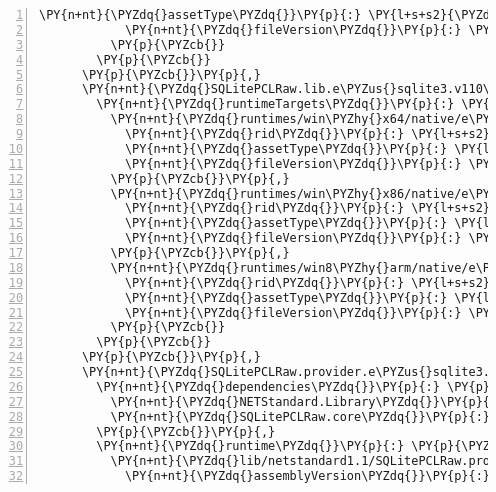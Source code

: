 \begin{Verbatim}[commandchars=\\\{\},numbers=left,firstnumber=1,stepnumber=1,numberblanklines=0]
            \PY{n+nt}{\PYZdq{}assetType\PYZdq{}}\PY{p}{:} \PY{l+s+s2}{\PYZdq{}native\PYZdq{}}\PY{p}{,}
            \PY{n+nt}{\PYZdq{}fileVersion\PYZdq{}}\PY{p}{:} \PY{l+s+s2}{\PYZdq{}0.0.0.0\PYZdq{}}
          \PY{p}{\PYZcb{}}
        \PY{p}{\PYZcb{}}
      \PY{p}{\PYZcb{}}\PY{p}{,}
      \PY{n+nt}{\PYZdq{}SQLitePCLRaw.lib.e\PYZus{}sqlite3.v110\PYZus{}xp/1.1.10\PYZdq{}}\PY{p}{:} \PY{p}{\PYZob{}}
        \PY{n+nt}{\PYZdq{}runtimeTargets\PYZdq{}}\PY{p}{:} \PY{p}{\PYZob{}}
          \PY{n+nt}{\PYZdq{}runtimes/win\PYZhy{}x64/native/e\PYZus{}sqlite3.dll\PYZdq{}}\PY{p}{:} \PY{p}{\PYZob{}}
            \PY{n+nt}{\PYZdq{}rid\PYZdq{}}\PY{p}{:} \PY{l+s+s2}{\PYZdq{}win\PYZhy{}x64\PYZdq{}}\PY{p}{,}
            \PY{n+nt}{\PYZdq{}assetType\PYZdq{}}\PY{p}{:} \PY{l+s+s2}{\PYZdq{}native\PYZdq{}}\PY{p}{,}
            \PY{n+nt}{\PYZdq{}fileVersion\PYZdq{}}\PY{p}{:} \PY{l+s+s2}{\PYZdq{}0.0.0.0\PYZdq{}}
          \PY{p}{\PYZcb{}}\PY{p}{,}
          \PY{n+nt}{\PYZdq{}runtimes/win\PYZhy{}x86/native/e\PYZus{}sqlite3.dll\PYZdq{}}\PY{p}{:} \PY{p}{\PYZob{}}
            \PY{n+nt}{\PYZdq{}rid\PYZdq{}}\PY{p}{:} \PY{l+s+s2}{\PYZdq{}win\PYZhy{}x86\PYZdq{}}\PY{p}{,}
            \PY{n+nt}{\PYZdq{}assetType\PYZdq{}}\PY{p}{:} \PY{l+s+s2}{\PYZdq{}native\PYZdq{}}\PY{p}{,}
            \PY{n+nt}{\PYZdq{}fileVersion\PYZdq{}}\PY{p}{:} \PY{l+s+s2}{\PYZdq{}0.0.0.0\PYZdq{}}
          \PY{p}{\PYZcb{}}\PY{p}{,}
          \PY{n+nt}{\PYZdq{}runtimes/win8\PYZhy{}arm/native/e\PYZus{}sqlite3.dll\PYZdq{}}\PY{p}{:} \PY{p}{\PYZob{}}
            \PY{n+nt}{\PYZdq{}rid\PYZdq{}}\PY{p}{:} \PY{l+s+s2}{\PYZdq{}win8\PYZhy{}arm\PYZdq{}}\PY{p}{,}
            \PY{n+nt}{\PYZdq{}assetType\PYZdq{}}\PY{p}{:} \PY{l+s+s2}{\PYZdq{}native\PYZdq{}}\PY{p}{,}
            \PY{n+nt}{\PYZdq{}fileVersion\PYZdq{}}\PY{p}{:} \PY{l+s+s2}{\PYZdq{}0.0.0.0\PYZdq{}}
          \PY{p}{\PYZcb{}}
        \PY{p}{\PYZcb{}}
      \PY{p}{\PYZcb{}}\PY{p}{,}
      \PY{n+nt}{\PYZdq{}SQLitePCLRaw.provider.e\PYZus{}sqlite3.netstandard11/1.1.10\PYZdq{}}\PY{p}{:} \PY{p}{\PYZob{}}
        \PY{n+nt}{\PYZdq{}dependencies\PYZdq{}}\PY{p}{:} \PY{p}{\PYZob{}}
          \PY{n+nt}{\PYZdq{}NETStandard.Library\PYZdq{}}\PY{p}{:} \PY{l+s+s2}{\PYZdq{}2.0.3\PYZdq{}}\PY{p}{,}
          \PY{n+nt}{\PYZdq{}SQLitePCLRaw.core\PYZdq{}}\PY{p}{:} \PY{l+s+s2}{\PYZdq{}1.1.10\PYZdq{}}
        \PY{p}{\PYZcb{}}\PY{p}{,}
        \PY{n+nt}{\PYZdq{}runtime\PYZdq{}}\PY{p}{:} \PY{p}{\PYZob{}}
          \PY{n+nt}{\PYZdq{}lib/netstandard1.1/SQLitePCLRaw.provider.e\PYZus{}sqlite3.dll\PYZdq{}}\PY{p}{:} \PY{p}{\PYZob{}}
            \PY{n+nt}{\PYZdq{}assemblyVersion\PYZdq{}}\PY{p}{:} \PY{l+s+s2}{\PYZdq{}1.1.10.86\PYZdq{}}\PY{p}{,}

\end{Verbatim}
